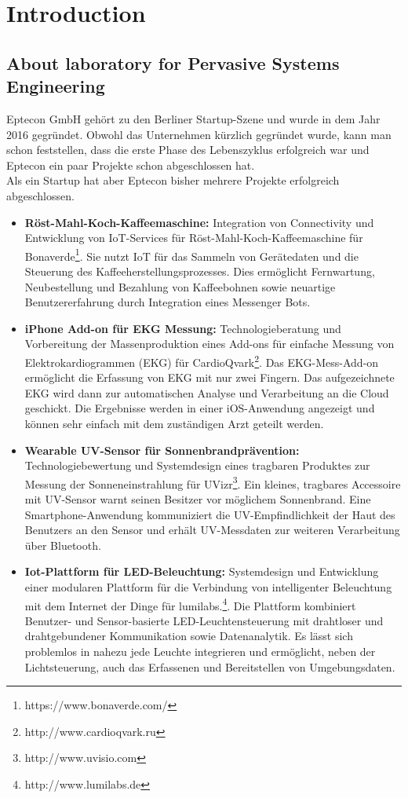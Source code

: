 \chapter{Introduction}
\label{sec:intro}
\section{About laboratory for Pervasive Systems Engineering}
\label{sec:intro:about_lab}
Eptecon GmbH gehört zu den Berliner Startup-Szene und wurde in dem Jahr 2016 gegründet. Obwohl das Unternehmen kürzlich gegründet wurde, kann man schon feststellen, dass die erste Phase des Lebenszyklus erfolgreich war und Eptecon ein paar Projekte schon abgeschlossen hat. \\

Als ein Startup hat aber Eptecon bisher mehrere Projekte erfolgreich abgeschlossen.
\begin{itemize}
	\item \textbf{Röst-Mahl-Koch-Kaffeemaschine:} Integration von Connectivity und Entwicklung von IoT-Services für Röst-Mahl-Koch-Kaffeemaschine für Bonaverde\footnote{https://www.bonaverde.com/}. Sie nutzt IoT für das Sammeln von Gerätedaten und die Steuerung des Kaffeeherstellungsprozesses. Dies ermöglicht Fernwartung, Neubestellung und Bezahlung von Kaffeebohnen sowie neuartige Benutzererfahrung durch Integration eines Messenger Bots.
	\item \textbf{iPhone Add-on für EKG Messung:} Technologieberatung und Vorbereitung der Massenproduktion eines Add-ons für einfache Messung von Elektrokardiogrammen (EKG) für CardioQvark\footnote{http://www.cardioqvark.ru}. Das EKG-Mess-Add-on ermöglicht die Erfassung von EKG mit nur zwei Fingern. Das aufgezeichnete EKG wird dann zur automatischen Analyse und Verarbeitung an die Cloud geschickt. Die Ergebnisse werden in einer iOS-Anwendung angezeigt und können sehr einfach mit dem zuständigen Arzt geteilt werden. 
	\item \textbf{Wearable UV-Sensor für Sonnenbrandprävention:} Technologiebewertung und Systemdesign eines tragbaren Produktes zur Messung der Sonneneinstrahlung für UVizr\footnote{http://www.uvisio.com}. Ein kleines, tragbares Accessoire mit UV-Sensor warnt seinen Besitzer vor möglichem Sonnenbrand. Eine Smartphone-Anwendung kommuniziert die UV-Empfindlichkeit der Haut des Benutzers an den Sensor und erhält UV-Messdaten zur weiteren Verarbeitung über Bluetooth. 
	\item \textbf{Iot-Plattform für LED-Beleuchtung:} Systemdesign und Entwicklung einer modularen Plattform für die Verbindung von intelligenter Beleuchtung mit dem Internet der Dinge für lumilabs.\footnote{http://www.lumilabs.de}. Die Plattform kombiniert Benutzer- und Sensor-basierte LED-Leuchtensteuerung mit drahtloser und drahtgebundener Kommunikation sowie Datenanalytik. Es lässt sich problemlos in nahezu jede Leuchte integrieren und ermöglicht, neben der Lichtsteuerung, auch das Erfassenen und Bereitstellen von Umgebungsdaten. 
\end{itemize}  
